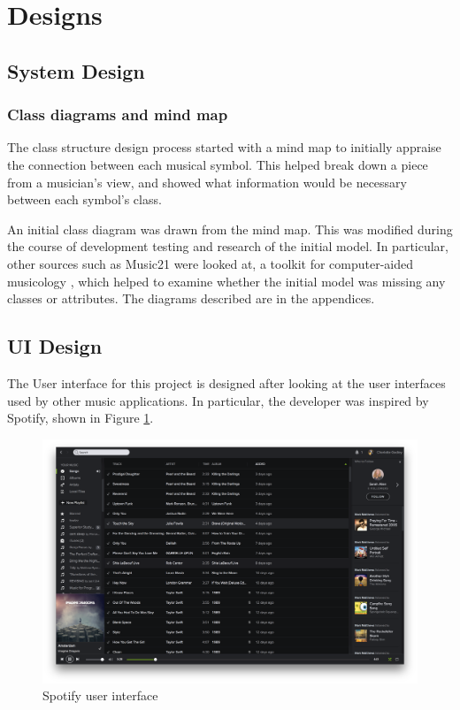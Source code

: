 \section{Designs}
\subsection{System Design}
\subsubsection{Class diagrams and mind map}
The class structure design process started with a mind map to initially appraise the connection between each musical symbol. This helped break down a piece from a musician's view, and showed what information would be necessary between each symbol's class.

An initial class diagram was drawn from the mind map. This was modified during the course of development testing and research of the initial model. In particular, other sources such as Music21 were looked at, a toolkit for computer-aided musicology \parencite{Music21}, which helped to examine whether the initial model was missing any classes or attributes. The diagrams described are in the appendices.
\subsection{UI Design}
The User interface for this project is designed after looking at the user interfaces used by other music applications. In particular, the developer was inspired by Spotify, shown in Figure \ref{fig:spotify}.

\begin{figure}[h]
    \centering
    \includegraphics[width=\textwidth]{screen.png}
    \caption{Spotify user interface}
    \label{fig:spotify}
\end{figure}
